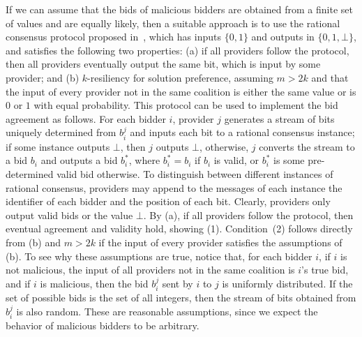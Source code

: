 If we can assume that the bids of malicious bidders are obtained from a finite
set of values and are equally likely, then 
a suitable approach is to use the rational consensus protocol proposed in~\cite{Afek2014},
which has inputs $\{0,1\}$ and outputs in $\{0,1,\bot\}$,
and satisfies the following two properties:
(a) if all providers follow the protocol, then all providers eventually
output the same bit, which is input by some provider;
and (b) $k$-resiliency for solution preference, assuming $m > 2k$
and that the input of every provider not in the same coalition
is either the same value or is $0$ or $1$ with equal probability.
This protocol can be used to implement the bid agreement as follows.
For each bidder $i$, provider $j$ generates a stream of bits uniquely
determined from $b_i^j$ and inputs each bit to a rational consensus instance;
if some instance outputs $\bot$, then $j$ outputs $\bot$,
otherwise, $j$ converts the stream to a bid $b_i$ and outputs a bid $b_i^*$,
where $b_i^* = b_i$ if $b_i$ is valid, or $b_i^*$ is some pre-determined valid bid otherwise.
To distinguish between different instances of rational consensus,
providers may append to the messages of each instance
the identifier of each bidder and the position of each bit.
Clearly, providers only output valid bids or the value $\bot$.
By (a), if all providers follow the protocol, then
eventual agreement and validity hold, showing (1).
Condition~(2) follows directly from (b) and $m>2k$ if
the input of every provider satisfies the assumptions of (b).
To see why these assumptions are true, notice
that, for each bidder $i$, if $i$ is not malicious, 
the input of all providers not in the same coalition is $i$'s true bid,
and if $i$ is malicious, then the bid $b_i^j$ sent by $i$ to $j$ is uniformly
distributed. If the set of possible bids is the set of all integers, 
then the stream of bits obtained from $b_i^j$ is also random.
These are reasonable assumptions, 
since we expect the behavior of malicious bidders to be arbitrary.

